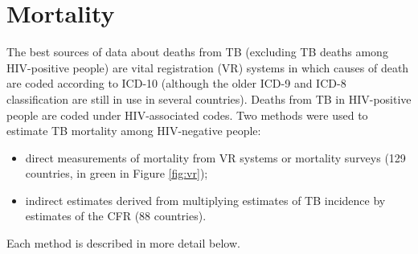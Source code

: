 \section{Mortality}  

The best sources of data about deaths from TB (excluding TB deaths among HIV-positive people) are vital registration (VR) systems in which causes of death are coded according to ICD-10 (although the older ICD-9 and ICD-8 classification are still in use in several countries). Deaths from TB in HIV-positive people are coded under HIV-associated codes.  Two methods were used to estimate TB mortality among HIV-negative people:   

\begin{itemize}
    \item direct measurements of mortality from VR systems or mortality surveys (129 countries, in green in Figure \ref{fig:vr});
    \item indirect estimates derived from multiplying estimates of TB incidence by estimates of the CFR (88 countries).
    \end{itemize}  
    
Each method is described in more detail below.  